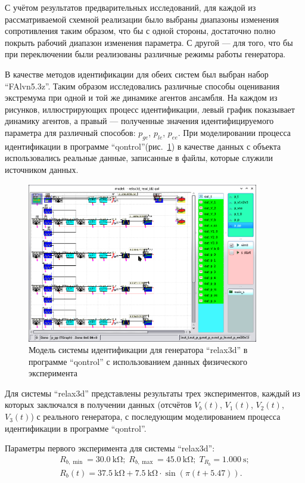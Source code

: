 С учётом результатов предварительных исследований,
для каждой из рассматриваемой схемной реализации было выбраны
диапазоны изменения сопротивления таким образом, что бы
с одной стороны,
достаточно полно покрыть рабочий диапазон изменения параметра.
С другой --- для того, что бы при переключении были реализованы
различные режимы работы генератора.

В качестве методов идентификации для обеих систем был выбран набор
``FAlvn5.3z''. Таким образом исследовались различные способы оценивания экстремума
при одной и той же динамике агентов ансамбля.
На каждом из рисунков, иллюстрирующих процесс идентификации,
левый график показывает динамику агентов, а правый --- полученные
значения идентифицируемого параметра для различный способов:
$p_{ge}$, $p_{le}$, $p_{ee}$.
При моделировании процесса идентификации в программе ``qontrol''(рис.~\ref{atu:f:relax3d_id_qontrol})
в качестве данных с объекта использовались реальные данные,
записанные в файлы, которые служили источником данных.

\begin{figure}[htb!]
  \centerline{\includegraphics[width=0.9\textwidth]{p/relax3d_id_qontrol.png} }
  \caption{Модель системы идентификации для генератора ``relax3d'' в программе ``qontrol'' с использованием данных физического эксперимента}
  \label{atu:f:relax3d_id_qontrol}
\end{figure}

Для системы ``relax3d'' представлены результаты трех экспериментов,
каждый из которых заключался в получении данных
(отсчётов $V_b(t)$, $V_1(t)$, $V_2(t)$, $V_3(t)$) с реального генератора,
с последующим моделированием процесса идентификации в программе ``qontrol''.

Параметры первого эксперимента для системы ``relax3d'':
%
\begin{equation}
  \begin{array}{c}
    R_{b,\min} = \SI{30.0}{\kilo\ohm};
    \;
    R_{b,\max} = \SI{45.0}{\kilo\ohm};
    \;
    T_{R_b} = \SI{1.000}{\second};
  \\
    R_b(t) = \SI{37.5}{\kilo\ohm} + \SI{7.5}{\kilo\ohm} \cdot \sin( \pi ( t + 5.47 ) ).
  \end{array}
  \label{atu:eq:relax3d_test1_cond}
\end{equation}

